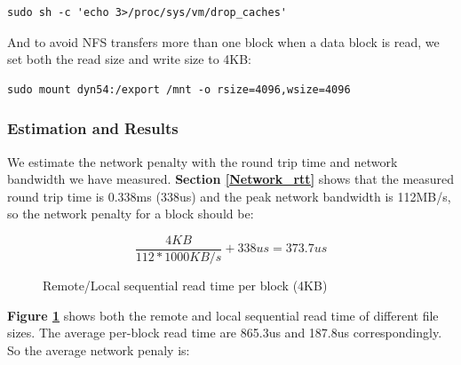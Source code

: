 \begin{lstlisting}
sudo sh -c 'echo 3>/proc/sys/vm/drop_caches'
\end{lstlisting}

And to avoid NFS transfers more than one block when a data block is read, we set both the read size and write size to 4KB:

\begin{lstlisting}
sudo mount dyn54:/export /mnt -o rsize=4096,wsize=4096
\end{lstlisting}


\subsubsection{Estimation and Results}
We estimate the network penalty with the round trip time and network bandwidth we have measured. \textbf{Section \ref{Network_rtt}} shows that the measured round trip time is 0.338ms (338us) and the peak network bandwidth is 112MB/s, so the network penalty for a block should be:

$$\frac{4KB}{112*1000KB/s} + 338us = 373.7us$$

\begin{figure}[ht]
    \centering
    \caption{Remote/Local sequential read time per block (4KB)}
    \label{rseq_read_time}
\end{figure}

\textbf{Figure \ref{rseq_read_time}} shows both the remote and local sequential read time of different file sizes. The average per-block read time are 865.3us and 187.8us correspondingly. So the average network penaly is:

